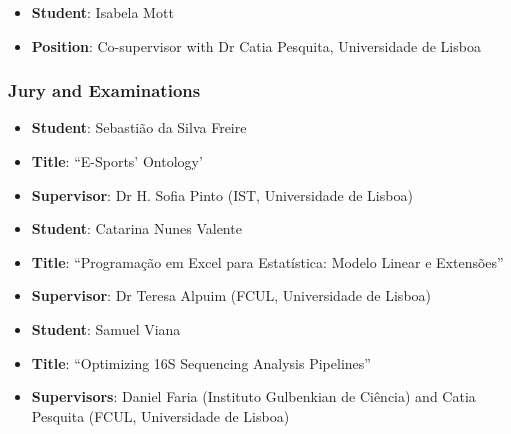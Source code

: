 \begin{itemize}
    \item \textbf{Student}: Isabela Mott
    \item \textbf{Position}: Co-supervisor with Dr Catia Pesquita, Universidade de Lisboa
\end{itemize}


\subsubsection{Jury and Examinations}

\begin{itemize}
    \item \textbf{Student}: Sebastião da Silva Freire
    \item \textbf{Title}: ``E-Sports' Ontology'
    \item \textbf{Supervisor}: Dr H. Sofia Pinto (IST, Universidade de Lisboa)
\end{itemize}

\begin{itemize}
    \item \textbf{Student}: Catarina Nunes Valente
    \item \textbf{Title}: ``Programação em Excel para Estatística: Modelo Linear e Extensões''
    \item \textbf{Supervisor}: Dr Teresa Alpuim (FCUL, Universidade de Lisboa)
\end{itemize}

\begin{itemize}
    \item \textbf{Student}: Samuel Viana
    \item \textbf{Title}: ``Optimizing 16S Sequencing Analysis Pipelines''
    \item \textbf{Supervisors}: Daniel Faria (Instituto Gulbenkian de Ciência) and Catia Pesquita (FCUL, Universidade de Lisboa)
\end{itemize}


